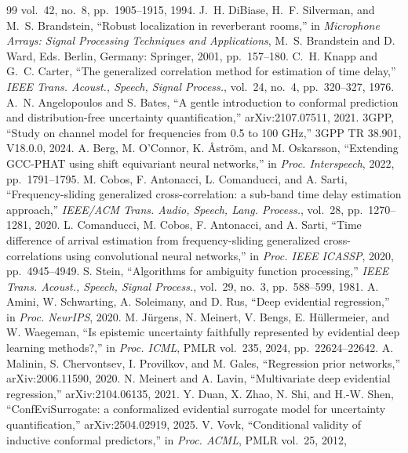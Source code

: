 \documentclass{article}
\begin{document}
\begin{thebibliography}{99}
vol.~42, no.~8, pp.~1905--1915, 1994.
 J.~H. DiBiase, H.~F. Silverman, and
M.~S. Brandstein, ``Robust localization in reverberant rooms,'' in
\emph{Microphone Arrays: Signal Processing Techniques and Applications},
M.~S. Brandstein and D. Ward, Eds. Berlin, Germany: Springer, 2001,
pp.~157--180.
 C.~H. Knapp and G.~C. Carter, ``The generalized
correlation method for estimation of time delay,'' \emph{IEEE Trans.
Acoust., Speech, Signal Process.}, vol.~24, no.~4, pp.~320--327, 1976.
 A.~N. Angelopoulos and S. Bates, ``A gentle
introduction to conformal prediction and distribution-free uncertainty
quantification,'' arXiv:2107.07511, 2021.
 3GPP, ``Study on channel model for frequencies from 0.5
to 100 GHz,'' 3GPP TR 38.901, V18.0.0, 2024.
 A. Berg, M. O'Connor, K. \AA{}str\"{o}m, and
M. Oskarsson, ``Extending GCC-PHAT using shift equivariant neural
networks,'' in \emph{Proc. Interspeech}, 2022, pp.~1791--1795.
 M. Cobos, F. Antonacci, L. Comanducci, and A. Sarti,
``Frequency-sliding generalized cross-correlation: a sub-band time delay
estimation approach,'' \emph{IEEE/ACM Trans. Audio, Speech, Lang.
Process.}, vol.~28, pp.~1270--1281, 2020.
 L. Comanducci, M. Cobos, F. Antonacci, and
A. Sarti, ``Time difference of arrival estimation from frequency-sliding
generalized cross-correlations using convolutional neural networks,'' in
\emph{Proc. IEEE ICASSP}, 2020, pp.~4945--4949.
 S. Stein, ``Algorithms for ambiguity function
processing,'' \emph{IEEE Trans. Acoust., Speech, Signal Process.},
vol.~29, no.~3, pp.~588--599, 1981.
 A. Amini, W. Schwarting, A. Soleimany, and D. Rus,
``Deep evidential regression,'' in \emph{Proc. NeurIPS}, 2020.
 M. J\"{u}rgens, N. Meinert, V. Bengs,
E. H\"{u}llermeier, and W. Waegeman, ``Is epistemic uncertainty faithfully
represented by evidential deep learning methods?,'' in \emph{Proc. ICML}, PMLR vol.~235, 2024,
pp.~22624--22642.
 A. Malinin, S. Chervontsev, I. Provilkov, and
M. Gales, ``Regression prior networks,'' arXiv:2006.11590, 2020.
 N. Meinert and A. Lavin, ``Multivariate deep
evidential regression,'' arXiv:2104.06135, 2021.
 Y. Duan, X. Zhao, N. Shi, and H.-W. Shen,
``ConfEviSurrogate: a conformalized evidential surrogate model for
uncertainty quantification,'' arXiv:2504.02919, 2025.
 V. Vovk, ``Conditional validity of inductive conformal
predictors,'' in \emph{Proc. ACML}, PMLR vol.~25, 2012,

\end{thebibliography}
\end{document}
